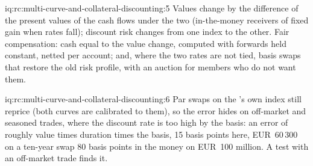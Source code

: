 \begin{solution}{iq:rc:multi-curve-and-collateral-discounting:5}
Values change by the difference of the present values of the cash flows under
the two  (in-the-money receivers of fixed gain when rates fall);
discount risk changes from one index to the other. Fair compensation: cash
equal to the value change, computed with forwards held constant, netted per
account; and, where the two rates are not tied, basis swaps that restore the
old risk profile, with an auction for members who do not want them.
\end{solution}

\begin{solution}{iq:rc:multi-curve-and-collateral-discounting:6}
Par swaps on the 's own index still reprice (both curves are
calibrated to them), so the error hides on off-market and seasoned trades,
where the discount rate is too high by the basis: an error of roughly value
times duration times the basis, 15 basis points here, EUR~60\,300 on a ten-year
swap 80 basis points in the money on EUR~100 million. A test with an off-market
trade finds it.
\end{solution}
